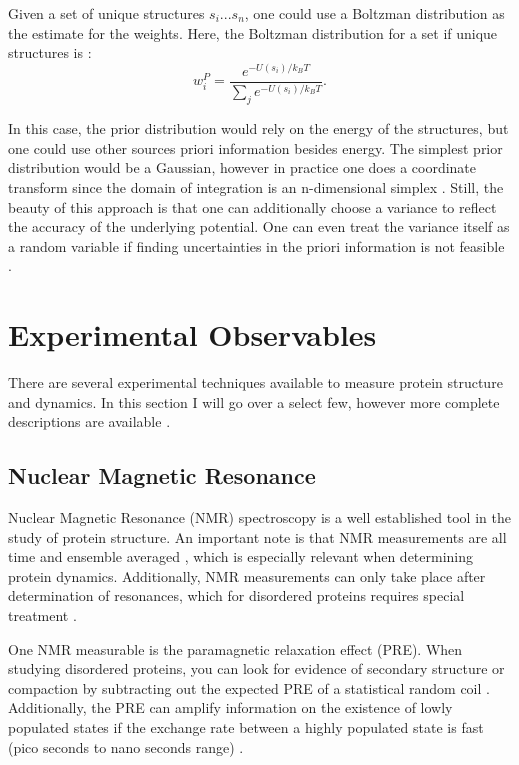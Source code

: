 \documentclass{article}
\begin{document}
Given a set of unique structures ${s_i...s_n}$, one could use a Boltzman distribution as the estimate for the weights. Here, the Boltzman distribution for a set if unique structures is \cite{fisherModelingIntrinsicallyDisordered2010}:
\begin{equation}
    w_i^P = \frac{e^{-U(s_i)/k_B T}}{\sum_j e^{-U(s_i)/k_B T}}.
\end{equation}

In this case, the prior distribution would rely on the energy of the structures, but one could use other sources priori information besides energy. The simplest prior distribution would be a Gaussian, however in practice one does a coordinate transform since the domain of integration is an n-dimensional simplex \cite{fisherModelingIntrinsicallyDisordered2010}. Still, the beauty of this approach is that one can additionally choose a variance to reflect the accuracy of the underlying potential. One can even treat the variance itself as a random variable if finding uncertainties in the priori information is not feasible \cite{fisherModelingIntrinsicallyDisordered2010}.

\section{Experimental Observables}
There are several experimental techniques available to measure protein structure and dynamics. In this section I will go over a select few, however more complete descriptions are available \cite{thomasenConformationalEnsemblesIntrinsically2022}.

\subsection{Nuclear Magnetic Resonance}
Nuclear Magnetic Resonance (NMR) spectroscopy is a well established tool in the study of protein structure.
An important note is that NMR measurements are all time and ensemble averaged \cite{marionIntroductionBiologicalNMR2013}, which is especially relevant when determining protein dynamics. Additionally, NMR measurements can only take place after determination of resonances, which for disordered proteins requires special treatment \cite{marionIntroductionBiologicalNMR2013}.

One NMR measurable is the paramagnetic relaxation effect (PRE). When studying disordered proteins, you can look for evidence of secondary structure or compaction by subtracting out the expected PRE of a statistical random coil \cite{cloreTheoryPracticeApplications2009}. Additionally, the PRE can amplify information on the existence of lowly populated states if the exchange rate between a highly populated state is fast (pico seconds to nano seconds range) \cite{cloreTheoryPracticeApplications2009}.
\end{document}
